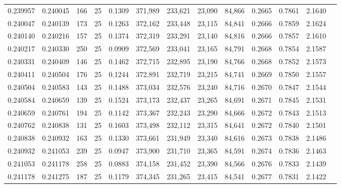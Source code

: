 \begin{tabular}{rrrrrrrrrrrrr}
0.239957 & 0.240045 &   166 &  25 &                                     0.1309 & 371,989 & 233,621 &  23,090 &  84,866 & 0.2665 & 0.7861 & 2.1640 \\
0.240047 & 0.240139 &   173 &  25 &                                     0.1263 & 372,162 & 233,448 &  23,115 &  84,841 & 0.2666 & 0.7859 & 2.1624 \\
0.240140 & 0.240216 &   157 &  25 &                                     0.1374 & 372,319 & 233,291 &  23,140 &  84,816 & 0.2666 & 0.7857 & 2.1610 \\
0.240217 & 0.240330 &   250 &  25 &                                     0.0909 & 372,569 & 233,041 &  23,165 &  84,791 & 0.2668 & 0.7854 & 2.1587 \\
0.240331 & 0.240409 &   146 &  25 &                                     0.1462 & 372,715 & 232,895 &  23,190 &  84,766 & 0.2668 & 0.7852 & 2.1573 \\
0.240411 & 0.240504 &   176 &  25 &                                     0.1244 & 372,891 & 232,719 &  23,215 &  84,741 & 0.2669 & 0.7850 & 2.1557 \\
0.240504 & 0.240583 &   143 &  25 &                                     0.1488 & 373,034 & 232,576 &  23,240 &  84,716 & 0.2670 & 0.7847 & 2.1544 \\
0.240584 & 0.240659 &   139 &  25 &                                     0.1524 & 373,173 & 232,437 &  23,265 &  84,691 & 0.2671 & 0.7845 & 2.1531 \\
0.240659 & 0.240761 &   194 &  25 &                                     0.1142 & 373,367 & 232,243 &  23,290 &  84,666 & 0.2672 & 0.7843 & 2.1513 \\
0.240762 & 0.240838 &   131 &  25 &                                     0.1603 & 373,498 & 232,112 &  23,315 &  84,641 & 0.2672 & 0.7840 & 2.1501 \\
0.240838 & 0.240932 &   163 &  25 &                                     0.1330 & 373,661 & 231,949 &  23,340 &  84,616 & 0.2673 & 0.7838 & 2.1486 \\
0.240932 & 0.241053 &   239 &  25 &                                     0.0947 & 373,900 & 231,710 &  23,365 &  84,591 & 0.2674 & 0.7836 & 2.1463 \\
0.241053 & 0.241178 &   258 &  25 &                                     0.0883 & 374,158 & 231,452 &  23,390 &  84,566 & 0.2676 & 0.7833 & 2.1439 \\
0.241178 & 0.241275 &   187 &  25 &                                     0.1179 & 374,345 & 231,265 &  23,415 &  84,541 & 0.2677 & 0.7831 & 2.1422 \\

\end{tabular}
